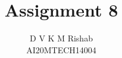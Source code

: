 \documentclass[journal,12pt,twocolumn]{IEEEtran}
\begin{document}
\makeatletter
{}
\makeatother
\let\StandardTheFigure\thefigure
\let\vec\mathbf
\def\putbox#1#2#3{\makebox[0in][l]{\makebox[#1][l]{}\raisebox{\baselineskip}[0in][0in]{\raisebox{#2}[0in][0in]{#3}}}}
     \def\rightbox#1{\makebox[0in][r]{#1}}
     \def\centbox#1{\makebox[0in]{#1}}
     \def\topbox#1{\raisebox{-\baselineskip}[0in][0in]{#1}}
     \def\midbox#1{\raisebox{-0.5\baselineskip}[0in][0in]{#1}}
\title{Assignment 8}
\author{D V K M Rishab \\ AI20MTECH14004}
%
%
%
% 
%
\end{document}
